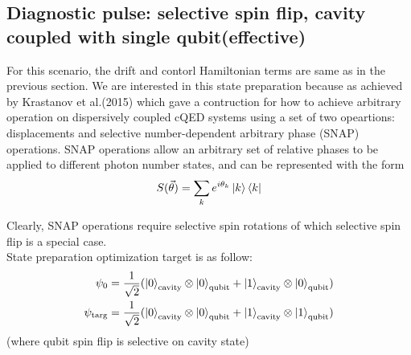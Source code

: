 \documentclass[12pt]{article}
\begin{document}
\subsection{Diagnostic pulse: selective spin flip, cavity coupled with single qubit(effective)}

For this scenario, the drift and contorl Hamiltonian terms are same as in the previous section. We are interested in this state 
preparation because as achieved by Krastanov et al.(2015) \cite{Krastanov2015} which gave a contruction for how to achieve arbitrary 
operation on dispersively coupled cQED systems using a set of two opeartions: displacements and selective number-dependent arbitrary phase (SNAP) operations. 
SNAP operations allow an arbitrary set of relative phases to be applied to different photon number states, and can be represented with the form
\begin{equation}
    S(\vec{\theta}) = \sum_k e^{i\theta_k} \ket{k}\bra{k}
\end{equation}

Clearly, SNAP operations require selective spin rotations of which selective spin flip is a special case.
\\
State preparation optimization target is as follow: 
\begin{align*}
    \psi_0 &= \frac{1}{\sqrt{2}} (\ket{0}_{\text{cavity}} \otimes \ket{0}_{\text{qubit}} 
                + \ket{1}_{\text{cavity}} \otimes \ket{0}_{\text{qubit}})\\
    \psi_{\text{targ}} &= \frac{1}{\sqrt{2}} (\ket{0}_{\text{cavity}} \otimes \ket{0}_{\text{qubit}} 
                + \ket{1}_{\text{cavity}} \otimes \ket{1}_{\text{qubit}})\\
\end{align*}
(where qubit spin flip is selective on cavity state)

\\
\end{document}
